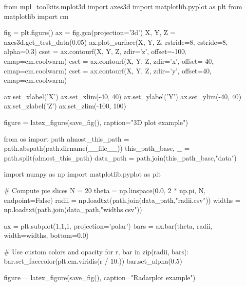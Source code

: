 \begin{pycode}[3dplot]
from mpl_toolkits.mplot3d import axes3d
import matplotlib.pyplot as plt
from matplotlib import cm

fig = plt.figure()
ax = fig.gca(projection='3d')
X, Y, Z = axes3d.get_test_data(0.05)
ax.plot_surface(X, Y, Z, rstride=8, cstride=8, alpha=0.3)
cset = ax.contourf(X, Y, Z, zdir='z', offset=-100, cmap=cm.coolwarm)
cset = ax.contourf(X, Y, Z, zdir='x', offset=-40, cmap=cm.coolwarm)
cset = ax.contourf(X, Y, Z, zdir='y', offset=40, cmap=cm.coolwarm)

ax.set_xlabel('X')
ax.set_xlim(-40, 40)
ax.set_ylabel('Y')
ax.set_ylim(-40, 40)
ax.set_zlabel('Z')
ax.set_zlim(-100, 100)

figure = latex_figure(save_fig(), caption="3D plot example")
\end{pycode}
\begin{pycode}[radar]
from os import path
almost_this_path = path.abspath(path.dirname(__file__))
this_path_base, _ = path.split(almost_this_path)
data_path = path.join(this_path_base,"data")
    
import numpy as np
import matplotlib.pyplot as plt


# Compute pie slices
N = 20
theta = np.linspace(0.0, 2 * np.pi, N, endpoint=False)
radii = np.loadtxt(path.join(data_path,"radii.csv"))
widths = np.loadtxt(path.join(data_path,"widths.csv"))

ax = plt.subplot(1,1,1, projection='polar')
bars = ax.bar(theta, radii, width=widths, bottom=0.0)

# Use custom colors and opacity
for r, bar in zip(radii, bars):
    bar.set_facecolor(plt.cm.viridis(r / 10.))
    bar.set_alpha(0.5)

figure = latex_figure(save_fig(), caption="Radarplot example")
\end{pycode}

